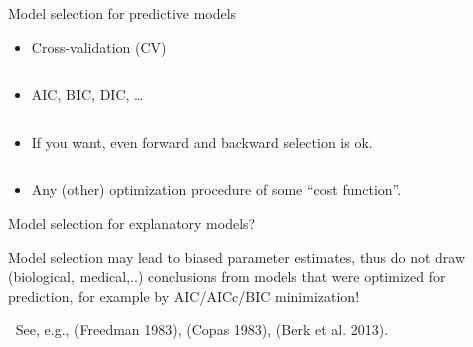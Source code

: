 \documentclass[
  10pt,
  ignorenonframetext,
]{beamer}
\providecommand{\tightlist}{%
  \setlength{\itemsep}{0pt}\setlength{\parskip}{0pt}}
\begin{document}
\begin{frame}
\begin{block}{Model selection for predictive models}
\protect\hypertarget{model-selection-for-predictive-models}{}
\(~\)

\begin{itemize}
\tightlist
\item
  Cross-validation (CV)
\end{itemize}

\(~\)

\begin{itemize}
\tightlist
\item
  AIC, BIC, DIC, \ldots{}
\end{itemize}

\(~\)

\begin{itemize}
\tightlist
\item
  If you want, even forward and backward selection is ok.
\end{itemize}

\(~\)

\begin{itemize}
\tightlist
\item
  Any (other) optimization procedure of some ``cost function''.
\end{itemize}
\end{block}
\end{frame}

\begin{frame}
\begin{block}{Model selection for explanatory models?}
\protect\hypertarget{model-selection-for-explanatory-models}{}
\(~\)

\begin{tcolorbox}
Model selection may lead to biased parameter estimates, thus do not draw (biological, medical,..) conclusions from models that were optimized for prediction, for example by AIC/AICc/BIC minimization!
\end{tcolorbox}

\(~\) \scriptsize See, e.g., (Freedman 1983), (Copas 1983), (Berk et al.
2013).
\end{block}
\end{frame}
\end{document}
